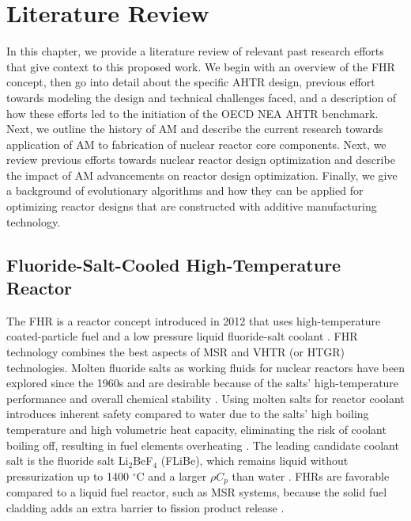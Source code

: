 \chapter{Literature Review}

In this chapter, we provide a literature review of relevant past research 
efforts that give context to this proposed work. 
We begin with an overview of the \gls{FHR} concept, then go into detail about 
the specific \gls{AHTR} design, previous effort towards modeling the design and 
technical challenges faced, and a description of how these efforts led to the 
initiation of the \gls{OECD} \gls{NEA} \gls{AHTR} benchmark.  
Next, we outline the history of \gls{AM} and describe the current 
research towards application of \gls{AM} to fabrication of 
nuclear reactor core components. 
Next, we review previous efforts towards nuclear reactor design optimization 
and describe the impact of \gls{AM} advancements on reactor 
design optimization. 
Finally, we give a background of evolutionary algorithms and how they can be 
applied for optimizing reactor designs that are constructed with additive 
manufacturing technology.

\section{Fluoride-Salt-Cooled High-Temperature Reactor}
The \gls{FHR} is a reactor concept introduced in 2012 that uses high-temperature 
coated-particle fuel and a low pressure liquid fluoride-salt coolant 
\cite{forsberg_fluoride-salt-cooled_2012,facilitators_fluoride-salt-cooled_2013}.
\gls{FHR} technology combines the best aspects of \gls{MSR} and \gls{VHTR} 
(or \gls{HTGR}) technologies. 
Molten fluoride salts as working fluids for nuclear reactors have been explored 
since the 1960s and are desirable because of the salts' high-temperature 
performance and overall chemical stability \cite{scarlat_design_2014}.  
Using molten salts for reactor coolant introduces inherent safety compared 
to water due to the salts' high boiling temperature and high volumetric 
heat capacity, eliminating the risk of coolant boiling off, resulting in 
fuel elements overheating \cite{ho_molten_2013}. 
The leading candidate coolant salt is the fluoride salt Li$_2$BeF$_4$ (FLiBe), 
which remains liquid without pressurization up to 1400 $^{\circ}$C and a larger 
$\rho C_p$ than water \cite{ho_molten_2013,forsberg_fluoride-salt-cooled_2012}. 
\glspl{FHR} are favorable compared to a liquid fuel reactor, such as
\gls{MSR} systems, because the solid fuel cladding adds an extra barrier to fission 
product release 
\cite{ho_molten_2013}.

